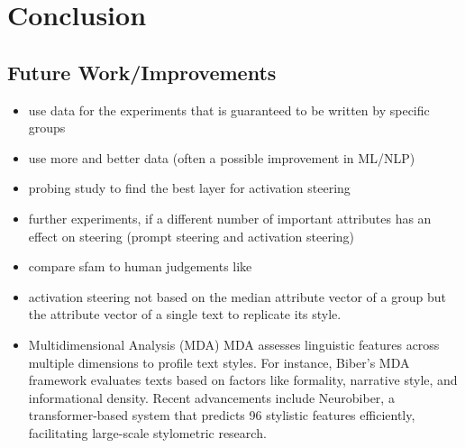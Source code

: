 \chapter{Conclusion}
\label{sec:conclusion}

\section{Future Work/Improvements} %
\begin{itemize}
  \item use data for the experiments that is guaranteed to be written by specific groups
  \item use more and better data (often a possible improvement in ML/NLP)
  \item probing study to find the best layer for activation steering
  \item further experiments, if a different number of important attributes has an effect on steering (prompt steering and activation steering)
  \item compare \ac{sfam} to human judgements like \citet{patelLearningInterpretableStyle2023}
  \item activation steering not based on the median attribute vector of a group but the attribute vector of a single text to replicate its style.
  \item Multidimensional Analysis (MDA) \newline
        MDA assesses linguistic features across multiple dimensions to profile text styles. For instance, Biber's MDA framework evaluates texts based on factors like formality, narrative style, and informational density. Recent advancements include Neurobiber, a transformer-based system that predicts 96 stylistic features efficiently, facilitating large-scale stylometric research.
\end{itemize}
